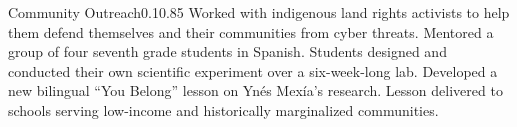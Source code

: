 \documentclass{federico_cv}
\begin{document}
\begin{tblSubSection}{Community Outreach}{0.1}{0.85}
{Worked with indigenous land rights activists to help them defend themselves and their communities from cyber threats.}
{Mentored a group of four seventh grade students in Spanish. Students designed and conducted their own scientific experiment over a six-week-long lab.}
{Developed a new bilingual ``You Belong'' lesson on Ynés Mexía's research. Lesson delivered to schools serving low-income and historically marginalized communities.}
\end{tblSubSection}
\end{document}
